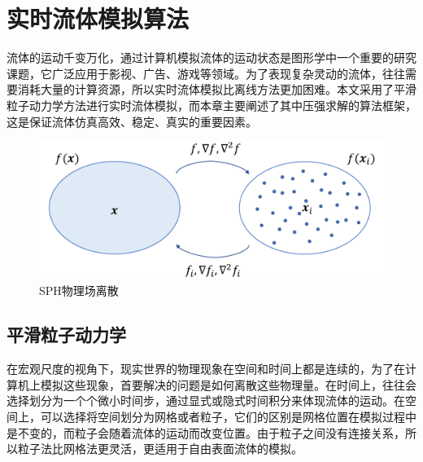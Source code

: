 \section{实时流体模拟算法}
    流体的运动千变万化，通过计算机模拟流体的运动状态是图形学中一个重要的研究课题，它广泛应用于影视、广告、游戏等领域。为了表现复杂灵动的流体，往往需要消耗大量的计算资源，所以实时流体模拟比离线方法更加困难。本文采用了平滑粒子动力学方法进行实时流体模拟，而本章主要阐述了其中压强求解的算法框架，这是保证流体仿真高效、稳定、真实的重要因素。

    \begin{figure}[htbp]
    	\centering
    	\includegraphics[width=.7\textwidth]{figures/simulation/field.pdf}
    	\caption{SPH物理场离散}
    \end{figure}

\subsection{平滑粒子动力学}
    在宏观尺度的视角下，现实世界的物理现象在空间和时间上都是连续的，为了在计算机上模拟这些现象，首要解决的问题是如何离散这些物理量。在时间上，往往会选择划分为一个个微小时间步，通过显式或隐式时间积分来体现流体的运动。在空间上，可以选择将空间划分为网格或者粒子，它们的区别是网格位置在模拟过程中是不变的，而粒子会随着流体的运动而改变位置。由于粒子之间没有连接关系，所以粒子法比网格法更灵活，更适用于自由表面流体的模拟。

